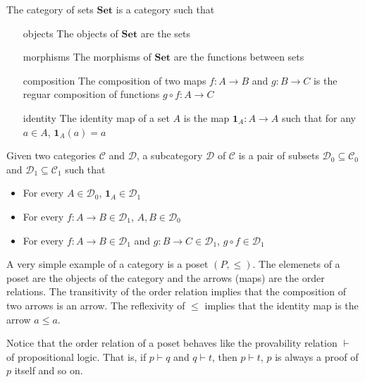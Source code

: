 \begin{example}
    The category of sets $\mathbf{Set}$ is a category such that
    \begin{itemize}
        \item[objects] The objects of $\mathbf{Set}$ are the sets
        \item[morphisms] The morphisms of $\mathbf{Set}$ are the functions between sets
        \item[composition] The composition of two maps $f:A\to B$ and $g:B\to C$ is the reguar composition of functions $g\circ f:A\to C$
        \item[identity] The identity map of a set $A$ is the map $\mathbf{1}_A:A\to A$ such that for any $a\in A$, $\mathbf{1}_A(a)=a$
    \end{itemize}    
\end{example}

\begin{definition}[Subcategory]
    Given two categories $\mathcal{C}$ and $\mathcal{D}$, a subcategory $\mathcal{D}$ of $\mathcal{C}$ is a pair of subsets
    $\mathcal{D}_0\subseteq \mathcal{C}_0$ and 
    $\mathcal{D}_1\subseteq \mathcal{C}_1$
    such that 
    \begin{itemize}
        \item For every $A\in\mathcal{D}_0$, $\mathbf{1}_A\in\mathcal{D}_1$
        \item For every $f:A\to B\in\mathcal{D}_1$, $A,B\in\mathcal{D}_0$
        \item For every $f:A\to B\in\mathcal{D}_1$ and $g:B\to C\in\mathcal{D}_1$, $g\circ f\in\mathcal{D}_1$
    \end{itemize}
\end{definition}

A very simple example of a category is a poset $(P,\leq)$. 
The elemenets of a poset are the objects of the category and the arrows (maps) are the order relations.
The transitivity of the order relation implies that the composition of two arrows is an arrow.
The reflexivity of $\leq$ implies that the identity map is the arrow $a\leq a$.

Notice that the order relation of a poset behaves 
like the provability relation $\vdash$ of propositional logic.
That is, if $p\vdash q$ and $q\vdash t$, then $p\vdash t$,
$p$ is always a proof of $p$ itself and so on.

